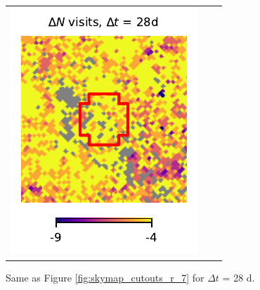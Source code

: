 \documentclass[preprintm,linenumbers]{aastex631}
\begin{document}
\begin{figure}
\begin{tabular}{  c c c}
				\includegraphics{results/skymaps_cutout/skymaps_cutout_delta_first_year_one_snap_v4_0_10yrs_db_noDD_noTwi_tscale-28_nside-256_doAllTemplateMetrics_reduceCount_r_GP_noDD_noTwi.pdf} \\
			\end{tabular}
			\caption{
				 Same as Figure \ref{fig:skymap_cutouts_r_7} for $\Delta t$ = 28 d.  
			}
   \label{fig:skymap_cutouts_r_28}
		\end{figure}


  
		

  		

    
	
\end{document}
